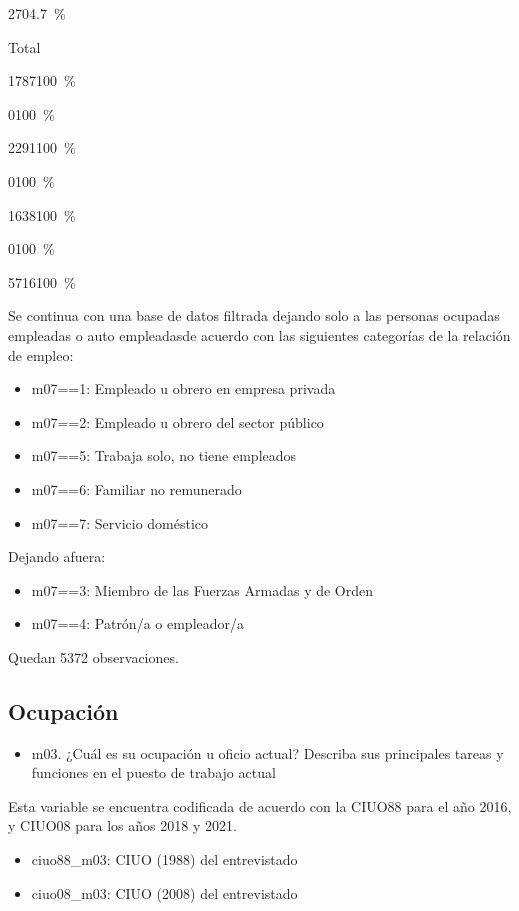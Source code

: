 \documentclass[
  12pt,
]{book}
\providecommand{\tightlist}{%
  \setlength{\itemsep}{0pt}\setlength{\parskip}{0pt}}
\begin{document}
{270}{4.7~\%}

Total

{1787}{100~\%}

{0}{100~\%}

{2291}{100~\%}

{0}{100~\%}

{1638}{100~\%}

{0}{100~\%}

{5716}{100~\%}

Se continua con una base de datos filtrada dejando solo a las personas ocupadas empleadas o auto empleadasde acuerdo con las siguientes categorías de la relación de empleo:

\begin{itemize}
\tightlist
\item
  m07==1: Empleado u obrero en empresa privada
\item
  m07==2: Empleado u obrero del sector público
\item
  m07==5: Trabaja solo, no tiene empleados
\item
  m07==6: Familiar no remunerado
\item
  m07==7: Servicio doméstico
\end{itemize}

Dejando afuera:

\begin{itemize}
\tightlist
\item
  m07==3: Miembro de las Fuerzas Armadas y de Orden
\item
  m07==4: Patrón/a o empleador/a
\end{itemize}

Quedan 5372 observaciones.

\hypertarget{ocupaciuxf3n}{%
\subsection{Ocupación}\label{ocupaciuxf3n}}

\begin{itemize}
\tightlist
\item
  m03. ¿Cuál es su ocupación u oficio actual? Describa sus principales tareas y funciones en el puesto de trabajo actual
\end{itemize}

Esta variable se encuentra codificada de acuerdo con la CIUO88 para el año 2016, y CIUO08 para los años 2018 y 2021.

\begin{itemize}
\tightlist
\item
  ciuo88\_m03: CIUO (1988) del entrevistado
\item
  ciuo08\_m03: CIUO (2008) del entrevistado
\end{itemize}
\end{document}
